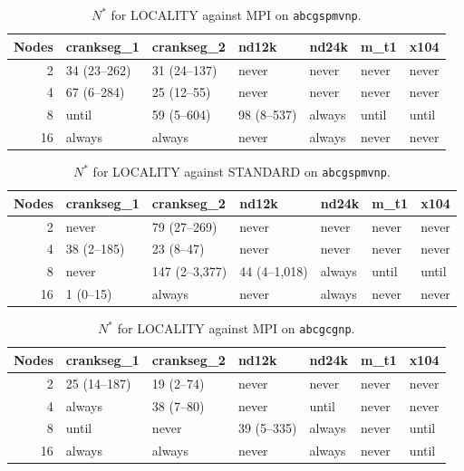 \documentclass[11pt]{article}
\newcommand{\spmvnp}{\texttt{abcgspmvnp}}
\newcommand{\cgnp}{\texttt{abcgcgnp}}
\begin{document}
\begin{table}[H]
\centering
\footnotesize
\setlength{\tabcolsep}{3.5pt}
\caption{$N^*$ for LOCALITY against MPI on \spmvnp.}
\label{tab:app:h8abcgspmvnpMPI}
\begin{tabular}{@{}rllllll@{}}
\toprule
Nodes & crankseg\_1 & crankseg\_2 & nd12k & nd24k & m\_t1 & x104 \\
\midrule
2 & 34 (23--262) & 31 (24--137) & never & never & never & never \\
4 & 67 (6--284) & 25 (12--55) & never & never & never & never \\
8 & until & 59 (5--604) & 98 (8--537) & always & until & until \\
16 & always & always & never & always & never & never \\
\bottomrule
\end{tabular}
\end{table}



\begin{table}[H]
\centering
\footnotesize
\setlength{\tabcolsep}{3.5pt}
\caption{$N^*$ for LOCALITY against STANDARD on \spmvnp.}
\label{tab:app:h8abcgspmvnpSTANDARD}
\begin{tabular}{@{}rllllll@{}}
\toprule
Nodes & crankseg\_1 & crankseg\_2 & nd12k & nd24k & m\_t1 & x104 \\
\midrule
2 & never & 79 (27--269) & never & never & never & never \\
4 & 38 (2--185) & 23 (8--47) & never & never & never & never \\
8 & never & 147 (2--3,377) & 44 (4--1,018) & always & until & until \\
16 & 1 (0--15) & always & never & always & never & never \\
\bottomrule
\end{tabular}
\end{table}



\begin{table}[H]
\centering
\footnotesize
\setlength{\tabcolsep}{3.5pt}
\caption{$N^*$ for LOCALITY against MPI on \cgnp.}
\label{tab:app:h8abcgcgnpMPI}
\begin{tabular}{@{}rllllll@{}}
\toprule
Nodes & crankseg\_1 & crankseg\_2 & nd12k & nd24k & m\_t1 & x104 \\
\midrule
2 & 25 (14--187) & 19 (2--74) & never & never & never & never \\
4 & always & 38 (7--80) & never & until & never & never \\
8 & until & never & 39 (5--335) & always & never & until \\
16 & always & always & never & always & never & until \\
\bottomrule
\end{tabular}
\end{table}
\end{document}
